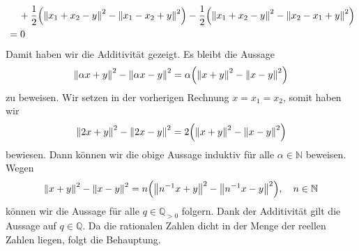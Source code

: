 \documentclass[german,12pt]{homework}
\newcommand{\NN}{\mathbb{N}}
\newcommand{\QQ}{\mathbb{Q}}
\DeclarePairedDelimiter{\norm}{\lVert}{\rVert}
\DeclarePairedDelimiter{\enbrace}{(}{)}
\begin{document}
\begin{enumerate}
\begin{align*}
            &\quad\, + \frac{1}{2}\enbrace*{\norm*{x_1 + x_2 - y}^2 -
            \norm*{x_1 - x_2 + y}^2} - \frac{1}{2}\enbrace*{\norm*{x_1 + x_2 -
            y}^2 - \norm*{x_2 - x_1 + y}^2}\\
            &= 0
        \end{align*}
        Damit haben wir die Additivität gezeigt. Es bleibt die Aussage
        \[\norm*{\alpha{x} + y}^2 - \norm*{\alpha{x} - y}^2 =
        \alpha\enbrace*{\norm*{x + y}^2 - \norm*{x - y}^2}\]
        zu beweisen. Wir setzen in der vorherigen Rechnung \(x = x_1 = x_2\),
        somit haben wir
        \[\norm*{2x + y}^2 - \norm*{2x - y}^2 = 2\enbrace*{\norm*{x + y}^2 -
        \norm*{x - y}^2}\]
        bewiesen. Dann können wir die obige Aussage induktiv für alle \(\alpha
        \in \NN\) beweisen. Wegen
        \[\norm*{x + y}^2 - \norm*{x - y}^2 = n\enbrace*{\norm*{n^{-1}x + y}^2
        - \norm*{n^{-1}x - y}^2}, \quad n \in \NN\]
        können wir die Aussage für alle \(q \in \QQ_{> 0}\) folgern. Dank der
        Additivität gilt die Aussage auf \(q \in \QQ\). Da die rationalen
        Zahlen dicht in der Menge der reellen Zahlen liegen, folgt die
        Behauptung.
    \end{enumerate}
\end{document}
